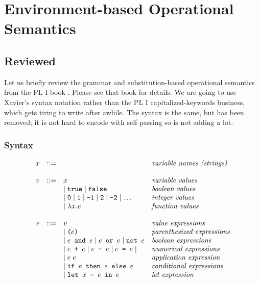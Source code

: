 %
%
\newcommand{\env}{\epsilon}
\newcommand{\store}{\sigma}
\chapter{Environment-based Operational Semantics}\label{ch_opsem}



\section{\Fb{} Reviewed}
\label{opsem_sec_d}

Let us briefly review the grammar and substitution-based operational semantics from the PL I book \cite{plbook}.  Please see that book for details.  We are going to use Xavier's syntax notation rather than the PL I capitalized-keywords business, which gets tiring to write after awhile.  The syntax is the same, but  has been removed; it is not hard to encode with self-passing so is not adding a lot.

\subsection{\Fb{} Syntax}\label{opsem_sec_syntax}


$$
\begin{array}{rcll}
x &::=&  &  \textit{variable names (strings)} \\
&&&\\
v &::=& x & \textit{variable values}\\
  &   & \mid \texttt{true} \mid \texttt{false}  & \textit{boolean
  values}\\
  &   & \mid \texttt{0}\mid \texttt{1}\mid \texttt{-1}\mid \texttt{2}\mid
  \texttt{-2}\mid \ldots & \textit{integer values}\\
  &   & \mid \lambda x. e & \textit{function values}\\
&&&\\
e &::=& v & \textit{value expressions}\\
  &   & \mid \texttt{(}e\texttt{)} &
        \textit{parenthesized expressions}\\
  &   & \mid e \texttt{ and } e \mid e \texttt{ or } e \mid \texttt{not }
        e & \textit{boolean expressions}\\
  &   & \mid e \texttt{ + }e \mid e \texttt{ - }e \mid e \texttt{ = }e \mid & \textit{numerical
        expressions}\\
  &   & \mid e\;e & \textit{application expression}\\
  &   & \mid \texttt{if }e\texttt{ then }e\texttt{ else }e &
        \textit{conditional expressions}\\
  &   & \mid \texttt{let } x \texttt{ = }e\texttt{ in }e & \textit{let expression}\\
\end{array}
$$

